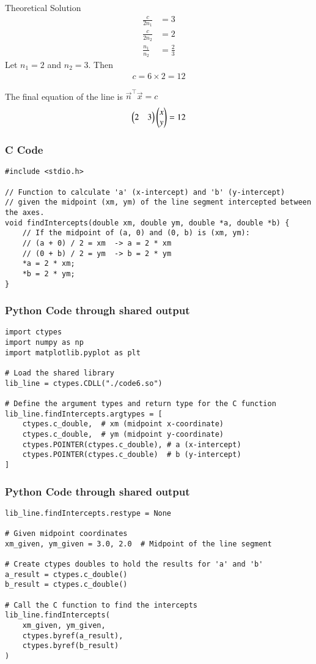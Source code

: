 \documentclass{beamer}
\begin{document}
\begin{frame}{Theoretical Solution}
\begin{align}
\frac{c}{2n_1}&=3\\
\frac{c}{2n_2}&=2\\
\frac{n_1}{n_2} &= \frac{2}{3}
\end{align}
Let $n_1=2$ and $n_2=3$.
Then
\begin{align}
c = 6 \times 2 = 12
\end{align}

The final equation of the line is $\vec{n}^\top \vec{x} = c$
\begin{align}
\begin{pmatrix}2 & 3\end{pmatrix} \begin{pmatrix}x \\ y\end{pmatrix} = 12
\end{align}
\end{frame}

\begin{frame}[fragile]
\frametitle{C Code}
\begin{lstlisting}
#include <stdio.h>

// Function to calculate 'a' (x-intercept) and 'b' (y-intercept)
// given the midpoint (xm, ym) of the line segment intercepted between the axes.
void findIntercepts(double xm, double ym, double *a, double *b) {
    // If the midpoint of (a, 0) and (0, b) is (xm, ym):
    // (a + 0) / 2 = xm  -> a = 2 * xm
    // (0 + b) / 2 = ym  -> b = 2 * ym
    *a = 2 * xm;
    *b = 2 * ym;
}
\end{lstlisting}
\end{frame}

\begin{frame}[fragile]
\frametitle{Python Code through shared output}
\begin{lstlisting}
import ctypes
import numpy as np
import matplotlib.pyplot as plt

# Load the shared library
lib_line = ctypes.CDLL("./code6.so")

# Define the argument types and return type for the C function
lib_line.findIntercepts.argtypes = [
    ctypes.c_double,  # xm (midpoint x-coordinate)
    ctypes.c_double,  # ym (midpoint y-coordinate)
    ctypes.POINTER(ctypes.c_double), # a (x-intercept)
    ctypes.POINTER(ctypes.c_double)  # b (y-intercept)
]
\end{lstlisting}
\end{frame}

\begin{frame}[fragile]
\frametitle{Python Code through shared output}
\begin{lstlisting}
lib_line.findIntercepts.restype = None

# Given midpoint coordinates
xm_given, ym_given = 3.0, 2.0  # Midpoint of the line segment

# Create ctypes doubles to hold the results for 'a' and 'b'
a_result = ctypes.c_double()
b_result = ctypes.c_double()

# Call the C function to find the intercepts
lib_line.findIntercepts(
    xm_given, ym_given,
    ctypes.byref(a_result),
    ctypes.byref(b_result)
)
\end{lstlisting}
\end{frame}
\end{document}
